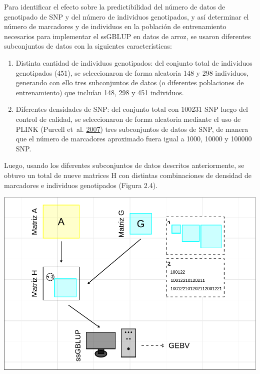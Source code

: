 \documentclass[11pt,spanish,a4paper,oneside,]{book} %
\begin{document}
Para identificar el efecto sobre la predictibilidad del número de datos de genotipado de SNP y del número de individuos genotipados, y así determinar el número de marcadores y de individuos en la población de entrenamiento necesarios para implementar el ssGBLUP en datos de arroz, se usaron diferentes subconjuntos de datos con la siguientes características:

\begin{enumerate}
\def\labelenumi{\arabic{enumi}.}
\item
  Distinta cantidad de individuos genotipados: del conjunto total de individuos genotipados (451), se seleccionaron de forma aleatoria 148 y 298 individuos, generando con ello tres subconjuntos de datos (o diferentes poblaciones de entrenamiento) que incluían 148, 298 y 451 individuos.
\item
  Diferentes densidades de SNP: del conjunto total con 100231 SNP luego del control de calidad, se seleccionaron de forma aleatoria mediante el uso de PLINK (Purcell et~al. \protect\hyperlink{ref-cite:49}{2007}) tres subconjuntos de datos de SNP, de manera que el número de marcadores aproximado fuera igual a 1000, 10000 y 100000 SNP.
\end{enumerate}

Luego, usando los diferentes subconjuntos de datos descritos anteriormente, se obtuvo un total de nueve matrices H con distintas combinaciones de densidad de marcadores e individuos genotipados (Figura 2.4).

\begin{center}\includegraphics[width=1\linewidth]{figures/Esquema_1} \end{center}
\end{document}
